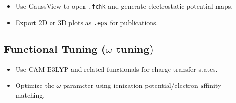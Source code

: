 \begin{itemize}
  \item Use GaussView to open \texttt{.fchk} and generate electrostatic potential maps.
  \item Export 2D or 3D plots as \texttt{.eps} for publications.
\end{itemize}

\subsection*{Functional Tuning ($\omega$ tuning)}

\begin{itemize}
  \item Use CAM-B3LYP and related functionals for charge-transfer states.
  \item Optimize the $\omega$ parameter using ionization potential/electron affinity matching.
\end{itemize}
